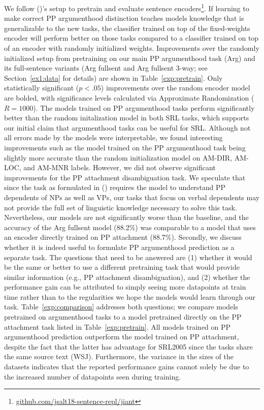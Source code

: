\documentclass[letterpaper]{article} %
\begin{document}
We follow \citeauthor{bowman2018looking} (\citeyear{bowman2018looking})'s setup to pretrain and evaluate sentence encoders\footnote{\url{github.com/jsalt18-sentence-repl/jiant}}. If learning to make correct PP argumenthood distinction teaches models knowledge that is generalizable to the new tasks, the classifier trained on top of the fixed-weights encoder will perform better on those tasks compared to a classifier trained on top of an encoder with randomly initialized weights. Improvements over the randomly initialized setup from pretraining on our main PP argumenthood task (Arg) and its full-sentence variants (Arg fullsent and Arg fullsent 3-way; see Section~\ref{ex1:data} for details) are shown in Table~\ref{exp:pretrain}. Only statistically significant ($p<.05$) improvements over the random encoder model are bolded, with significance levels calculated via Approximate Randomization \cite{yeh2000more} ($R=1000$). The models trained on PP argumenthood tasks perform significantly better than the random initalization model in both SRL tasks, which supports our initial claim that argumenthood tasks can be useful for SRL. Although not all errors made by the models were interpretable, we found interesting improvements such as the model trained on the PP argumenthood task being slightly more accurate than the random initialization model on \textsc{AM-DIR, AM-LOC}, and \textsc{AM-MNR} labels.  However, we did not observe significant improvements for the PP attachment disambiguation task. We speculate that since the task as formulated in \citeauthor{belinkov2014exploring} (\citeyear{belinkov2014exploring}) requires the model to understand PP dependents of NPs as well as VPs, our tasks that focus on verbal dependents may not provide the full set of linguistic knowledge necessary to solve this task. Nevertheless, our models are not significantly worse than the baseline, and the accuracy of the Arg fullsent model (88.2\%) was comparable to a model that uses an encoder directly trained on PP attachment (88.7\%).  Secondly, we discuss whether it is indeed useful to formulate PP argumenthood prediction as a separate task. The questions that need to be answered are (1) whether it would be the same or better to use a different pretraining task that would provide similar information (e.g., PP attachment disambiguation), and (2) whether the performance gain can be attributed to simply seeing more datapoints at train time rather than to the regularities we hope the models would learn through our task. Table~\ref{exp:comparison} addresses both questions; we compare models pretrained on argumenthood tasks to a model pretrained directly on the PP attachment task listed in Table~\ref{exp:pretrain}. All models trained on PP argumenthood prediction outperform the model trained on PP attachment, despite the fact that the latter has advantage for SRL2005 since the tasks share the same source text (WSJ). Furthermore, the variance in the sizes of the datasets indicates that the reported performance gains cannot solely be due to the increased number of datapoints seen during training.
\end{document}
